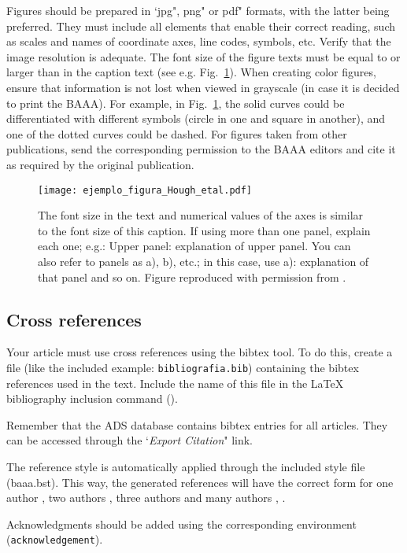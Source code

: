 \documentclass[baaa]{baaa}
\begin{document}
Figures should be prepared in `jpg", png" or pdf" formats, with the latter being preferred. They must include all elements that enable their correct reading, such as scales and names of coordinate axes, line codes, symbols, etc. Verify that the image resolution is adequate. The font size of the figure texts must be equal to or larger than in the caption text (see e.g. Fig.~\ref{Figura}). When creating color figures, ensure that information is not lost when viewed in grayscale (in case it is decided to print the BAAA). For example, in Fig.~\ref{Figura}, the solid curves could be differentiated with different symbols (circle in one and square in another), and one of the dotted curves could be dashed. For figures taken from other publications, send the corresponding permission to the BAAA editors and cite it as required by the original publication.

\begin{figure}[!t]
\centering
\texttt{[image: ejemplo\_figura\_Hough\_etal.pdf]}
\caption{The font size in the text and numerical values of the axes is similar to the font size of this caption. If using more than one panel, explain each one; e.g.: Upper panel: explanation of upper panel. You can also refer to panels as a), b), etc.; in this case, use a): explanation of that panel and so on. Figure reproduced with permission from \cite{Hough_etal_BAAA_2020}.}
\label{Figura}
\end{figure}

\subsection{Cross references}\label{ref}

Your article must use cross references using the {\sc bibtex} tool. To do this, create a file (like the included example: {\tt bibliografia.bib}) containing the {\sc bibtex} references used in the text. Include the name of this file in the \LaTeX{} bibliography inclusion command (\verb||).

Remember that the ADS database contains {\sc bibtex} entries for all articles. They can be accessed through the `{\em Export Citation}" link.

The reference style is automatically applied through the included style file (baaa.bst). This way, the generated references will have the correct form for one author \citep{hubble_expansion_1929}, two authors \citep{penzias_cmb_1965,penzias_cmb_II_1965}, three authors \citep{navarro_NFW_1997} and many authors \citep{riess_SN1a_1998}, \citep{Planck_2016}.

\begin{acknowledgement}
Acknowledgments should be added using the corresponding environment (\texttt{acknowledgement}).
\end{acknowledgement}


\small

 
\end{document}
